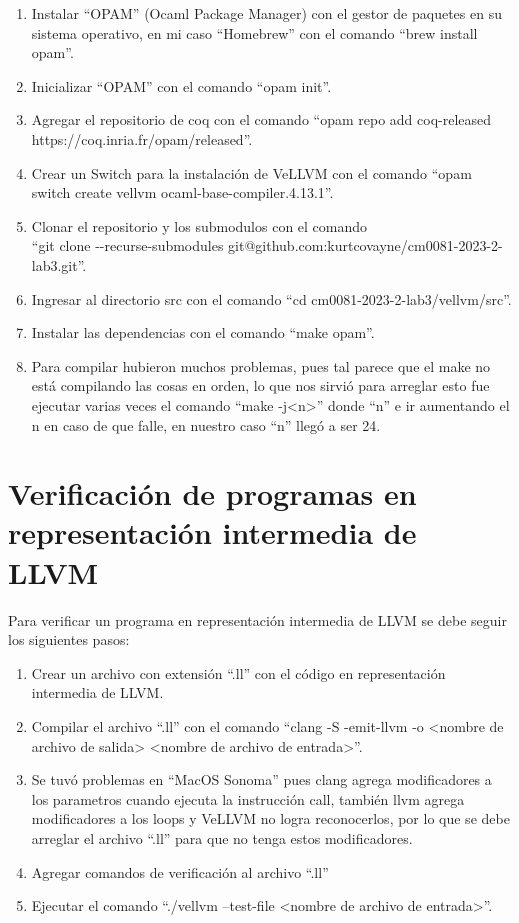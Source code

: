 \documentclass{hw-template}
\begin{document}
\begin{enumerate}
    \item Instalar ``OPAM'' \cite{opam} (Ocaml Package Manager) con el gestor
    de paquetes en su sistema operativo, en mi caso ``Homebrew'' \cite{homebrew}
    con el comando ``brew install opam''.
    \item Inicializar ``OPAM'' con el comando ``opam init''.
    \item Agregar el repositorio de coq con el comando ``opam repo
    add coq-released https://coq.inria.fr/opam/released''.
    \item Crear un Switch para la instalación de VeLLVM con el comando 
    ``opam switch create vellvm ocaml-base-compiler.4.13.1''.
    \item Clonar el repositorio y los submodulos con el comando \\
    ``git clone {-}{-}recurse-submodules git@github.com:kurtcovayne/cm0081-2023-2-lab3.git''.
    \item Ingresar al directorio src con el comando ``cd cm0081-2023-2-lab3/vellvm/src''.
    \item Instalar las dependencias con el comando ``make opam''.
    \item Para compilar hubieron muchos problemas, pues tal parece que el make no está
    compilando las cosas en orden, lo que nos sirvió para arreglar esto fue
    ejecutar varias veces el comando ``make -j<n>'' donde ``n'' e ir aumentando
    el n en caso de que falle, en nuestro caso ``n'' llegó a ser 24.
\end{enumerate}

\section{Verificación de programas en representación intermedia de LLVM}

Para verificar un programa en representación intermedia de LLVM se debe
seguir los siguientes pasos:

\begin{enumerate}
    \item Crear un archivo con extensión ``.ll'' con el código en representación
    intermedia de LLVM.
    \item Compilar el archivo ``.ll'' con el comando ``clang -S -emit-llvm -o
    <nombre de archivo de salida> <nombre de archivo de entrada>''.
    \item Se tuvó problemas en ``MacOS Sonoma'' pues clang agrega modificadores
    a los parametros cuando ejecuta la instrucción call, también llvm agrega
    modificadores a los loops y VeLLVM no logra reconocerlos, por lo que se debe
    arreglar el archivo ``.ll'' para que no tenga estos modificadores.
    \item Agregar comandos de verificación al archivo ``.ll''
    \item Ejecutar el comando ``./vellvm --test-file <nombre de archivo de entrada>''.
\end{enumerate}
\end{document}
